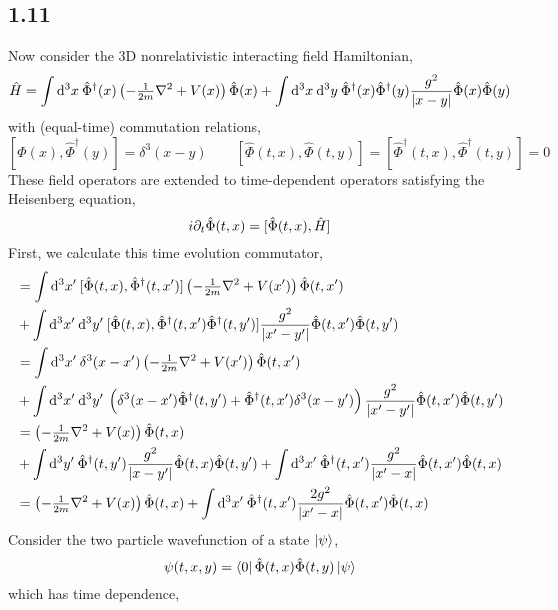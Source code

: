 \documentclass[12pt]{extarticle}
\newcommand{\field}{\hat{\Phi}}
\newcommand{\dfield}{\hat{\Phi}^\dagger}
\begin{document}
\subsection*{1.11}
Now consider the 3D nonrelativistic interacting field Hamiltonian,
\[ \hamilt = \int \d{^3x} \dfield(x) \left( -\tfrac{1}{2m} \nabla^2 + V(x)\right) \field(x) + \int \d{^3x} \d{^3y} \dfield(x) \dfield(y) \frac{g^2}{|x - y|} \field(x) \field(y) \]
with (equal-time) commutation relations,
\[[\field(x), \dfield(y)] = \delta^3(x - y) \quad \quad [\field(t, x), \field(t, y)] = [\dfield(t, x), \dfield(t, y)] = 0\]
These field operators are extended to time-dependent operators satisfying the Heisenberg equation,
\[ i \partial_t \field(t, x) = [\field(t, x), \hamilt] \]
First, we calculate this time evolution commutator,
\begin{align*}
[\field(t, x), \hamilt] & = \int \d{^3 x'} [\field(t, x), \dfield(t, x')] \left( -\tfrac{1}{2m} \nabla^2 + V(x')\right) \field(t, x') 
\\
& + \int \d{^3x'} \d{^3y'} [\field(t, x), \dfield(t, x') \dfield(t, y')] \frac{g^2}{|x' - y'|} \field(t, x') \field(t, y')
\\
& = \int \d{^3 x'} \delta^3(x - x') \left( -\tfrac{1}{2m} \nabla^2 + V(x')\right) \field(t, x')
\\
& + \int \d{^3x'} \d{^3y'} \left( \delta^3(x - x') \dfield(t, y') + \dfield(t, x') \delta^3(x - y') \right) \frac{g^2}{|x' - y'|} \field(t, x') \field(t, y')
\\
& = \left( -\tfrac{1}{2m} \nabla^2 + V(x)\right) \field(t, x)
\\
& + \int \d{^3y'} \dfield(t, y') \frac{g^2}{|x - y'|} \field(t, x) \field(t, y') + \int \d{^3x'}  \dfield(t, x') \frac{g^2}{|x' - x|} \field(t, x') \field(t, x)
\\
& = \left( -\tfrac{1}{2m} \nabla^2 + V(x)\right) \field(t, x) + \int \d{^3x'}  \dfield(t, x') \frac{2 g^2}{|x' - x|} \field(t, x') \field(t, x)
\end{align*}
Consider the two particle wavefunction of a state $\left| \psi \right>$,
\[ \psi(t, x, y) = \bra{0} \field(t, x) \field(t, y) \ket{\psi} \]
which has time dependence,
\end{document}
